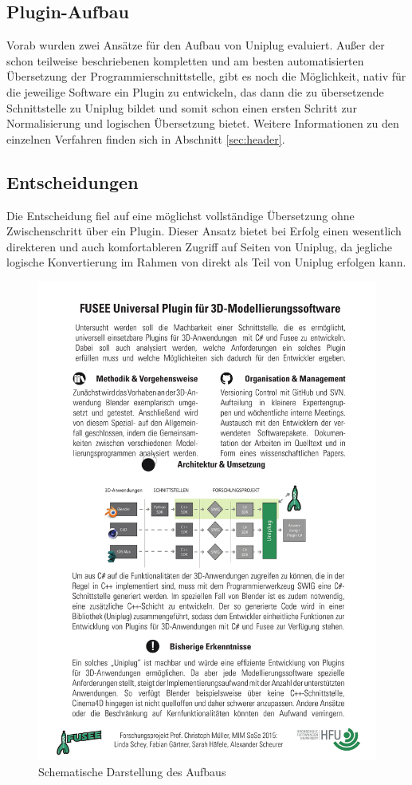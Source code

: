 \subsection{Plugin-Aufbau}
Vorab wurden zwei Ansätze für den Aufbau von Uniplug evaluiert. Außer der schon teilweise beschriebenen kompletten und am besten automatisierten Übersetzung der Programmierschnittstelle, gibt es noch die Möglichkeit, nativ für die jeweilige Software ein Plugin zu entwickeln, das dann die zu übersetzende Schnittstelle zu Uniplug bildet und somit schon einen ersten Schritt zur Normalisierung und logischen Übersetzung bietet. Weitere Informationen zu den einzelnen Verfahren finden sich in Abschnitt \ref{sec:header}.

\subsection{Entscheidungen}
Die Entscheidung fiel auf eine möglichst vollständige Übersetzung ohne Zwischenschritt über ein Plugin. Dieser Ansatz bietet bei Erfolg einen wesentlich direkteren und auch komfortableren Zugriff auf Seiten von Uniplug, da jegliche logische Konvertierung im Rahmen von \CS direkt als Teil von Uniplug erfolgen kann.

\begin{figure}[htbp]
\center
\includegraphics[width=1\textwidth]{images/aufbau}
\caption{Schematische Darstellung des Aufbaus}
\label{fig:aufbau}
\end{figure}